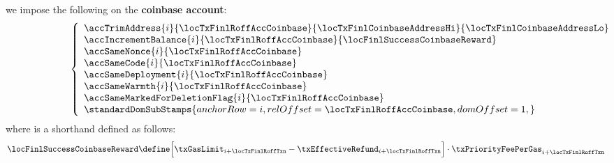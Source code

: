 we impose the following on the \textbf{coinbase account}:
\[
	\left\{\begin{array}{lcl}
		\accTrimAddress
		{i}{\locTxFinlRoffAccCoinbase}
		{\locTxFinlCoinbaseAddressHi}
		{\locTxFinlCoinbaseAddressLo} \\
		\multicolumn{3}{l}{\accIncrementBalance               {i}{\locTxFinlRoffAccCoinbase}{\locFinlSuccessCoinbaseReward}} \\
		\multicolumn{3}{l}{\accSameNonce                      {i}{\locTxFinlRoffAccCoinbase}} \\
		\multicolumn{3}{l}{\accSameCode                       {i}{\locTxFinlRoffAccCoinbase}} \\
		\multicolumn{3}{l}{\accSameDeployment                 {i}{\locTxFinlRoffAccCoinbase}} \\
		\multicolumn{3}{l}{\accSameWarmth                     {i}{\locTxFinlRoffAccCoinbase}} \\
		\multicolumn{3}{l}{\accSameMarkedForDeletionFlag      {i}{\locTxFinlRoffAccCoinbase}} \\
		\multicolumn{3}{l}{
			\standardDomSubStamps {
				anchorRow   = i                         ,
				relOffset   = \locTxFinlRoffAccCoinbase ,
				domOffset   = 1                         ,
			}
		} \\
	\end{array}\right.
\]
where \locFinlSuccessCoinbaseReward{} is a shorthand defined as follows:
\[
	\locFinlSuccessCoinbaseReward \define
	\Big[ \txGasLimit_{i + \locTxFinlRoffTxn} - \txEffectiveRefund_{i + \locTxFinlRoffTxn} \Big]
	\cdot \txPriorityFeePerGas_{i + \locTxFinlRoffTxn}
\]
